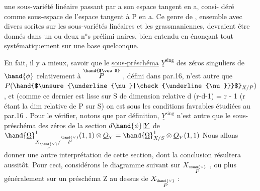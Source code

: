 
une sous-variété linéaire passant par a son espace tangent en a, consi-%
déré comme sous-espace  de l'espace tangent à P en a. Ce genre
\margin{\hand{||}}de , ensemble avec divers sorites sur les sous-variétés linéaires
et les grassmaniennes, devraient être donnés dans un ou deux n$^{\text{o}}$s prélimi
naires, bien entendu en énonçant tout systématiquement sur une base
quelconque.

En fait, il y a mieux, savoir que le \uline{sous-préschéma} $\underline{Y}^{\mathrm{sing}}$
des zéros singuliers de $\hand{\phi}$ relativement à $\overset{\hand{$\vee$}}{P}$ , défini dans par.16, n'est
autre que $P(\hand{$\unsure{\underline{\nu}|\check{\underline{\nu}}}$}_{X/P})$ , et (comme ce dernier est lisse sur S de dimension
relative d \unsure{$+$} (r-d-1) = r - 1 (r étant la dim relative de P sur S)
on est sous les conditions favrables étudiées au par.16 .  Pour le vérifier,
notons que par définition, $\underline{Y}^{\mathrm{sing}}$ n'est autre que le sous-préschéma 
des zéros de la section \inserted{$\psi =$} $d\hand{\phi}|\underline{Y}$ de $\hand{\underline{\Omega}}^1_{X_{\overset{\hand{\vee}}{P}}/\overset{\hand{\vee}}{P}}(1,1)\otimes \underline{O}_Y = \hand{\underline{\Omega}}^1_{X/S}\otimes\underline{O}_Y(1,1)$
Nous allons donner une autre interprétation de cette section, dont
la conclusion résultera aussitôt. Pour ceci, considérons le diagramme
 
suivant sur $X_{\overset{\hand{\vee}}{P}}$ , ou plus généralement sur un préschéma Z  au dessus de
$X_{\overset{\hand{\vee}}{P}}$ :

